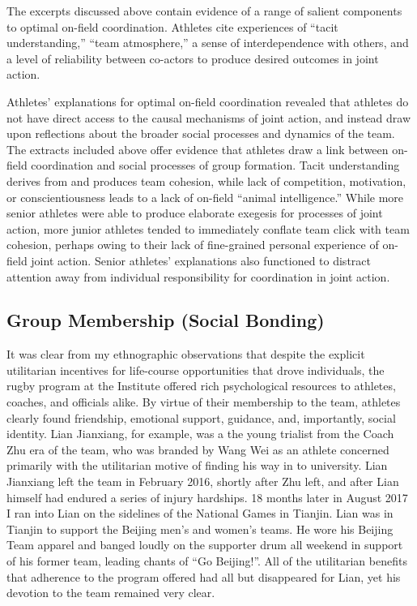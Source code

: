 \begin{CJK}{UTF8}{gbsn}
The excerpts discussed above contain evidence of a range of salient components to optimal on-field coordination.  Athletes cite experiences of ``tacit understanding,'' ``team atmosphere,'' a sense of interdependence with others, and a level of reliability between co-actors to produce desired outcomes in joint action.



Athletes' explanations for optimal on-field coordination revealed that athletes do not have direct access to the causal mechanisms of joint action, and instead draw upon reflections about the broader social processes and dynamics of the team.  The extracts included above offer evidence that athletes draw a link between on-field coordination and social processes of group formation.  Tacit understanding derives from and produces team cohesion, while lack of competition, motivation, or conscientiousness leads to a lack of on-field ``animal intelligence.''  While more senior athletes were able to produce elaborate exegesis for processes of joint action, more junior athletes tended to immediately conflate team click with team cohesion, perhaps owing to their lack of fine-grained personal experience of on-field joint action.  Senior athletes' explanations also functioned to distract attention away from individual responsibility for coordination in joint action.






\clearpage
\subsection{Group Membership (Social Bonding)\label{sect:socialBonding}}

It was clear from my ethnographic observations that despite the explicit utilitarian incentives for life-course opportunities that drove individuals, the rugby program at the Institute offered rich psychological resources to athletes, coaches, and officials alike.  By virtue of their membership to the team, athletes clearly found friendship, emotional support, guidance, and, importantly, social identity.  Lian Jianxiang, for example, was a the young trialist from the Coach Zhu era of the team, who was branded by Wang Wei as an athlete concerned primarily with the utilitarian motive of finding his way in to university.  Lian Jianxiang left the team in February 2016, shortly after Zhu left, and after Lian himself had endured a series of injury hardships.  18 months later in August 2017 I ran into Lian on the sidelines of the National Games in Tianjin. Lian was in Tianjin to support the Beijing men's and women's teams.  He wore his Beijing Team apparel and banged loudly on the supporter drum all weekend in support of his former team, leading chants of ``Go Beijing!''.  All of the utilitarian benefits that adherence to the program offered had all but disappeared for Lian, yet his devotion to the team remained very clear.


\end{CJK}
